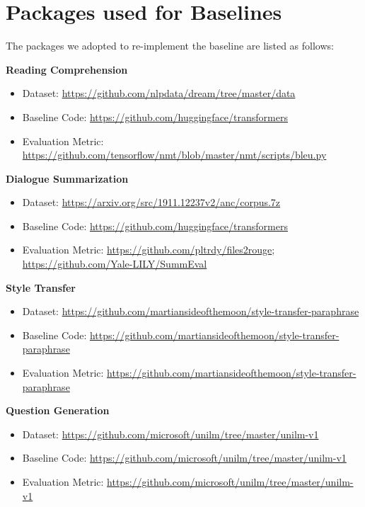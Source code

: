 \appendix

\section{Packages used for Baselines}
\label{sec:pkgs}

The packages we adopted to re-implement the baseline are listed as follows:%

\textbf{Reading Comprehension}
\begin{itemize}
	\item Dataset: \url{https://github.com/nlpdata/dream/tree/master/data}
	\item Baseline Code: \url{https://github.com/huggingface/transformers}
	\item Evaluation Metric: \url{https://github.com/tensorflow/nmt/blob/master/nmt/scripts/bleu.py}
\end{itemize}

\textbf{Dialogue Summarization}
\begin{itemize}
	\item Dataset: \url{https://arxiv.org/src/1911.12237v2/anc/corpus.7z}
	\item Baseline Code: \url{https://github.com/huggingface/transformers}
	\item Evaluation Metric: \url{https://github.com/pltrdy/files2rouge}; \url{https://github.com/Yale-LILY/SummEval}
\end{itemize}

\textbf{Style Transfer}
\begin{itemize}
	\item Dataset: \url{https://github.com/martiansideofthemoon/style-transfer-paraphrase}
	\item Baseline Code: \url{https://github.com/martiansideofthemoon/style-transfer-paraphrase}
	\item Evaluation Metric: \url{https://github.com/martiansideofthemoon/style-transfer-paraphrase}
\end{itemize}

\textbf{Question Generation}
\begin{itemize}
	\item Dataset: \url{https://github.com/microsoft/unilm/tree/master/unilm-v1}
	\item Baseline Code: \url{https://github.com/microsoft/unilm/tree/master/unilm-v1}
	\item Evaluation Metric: \url{https://github.com/microsoft/unilm/tree/master/unilm-v1}
\end{itemize}

